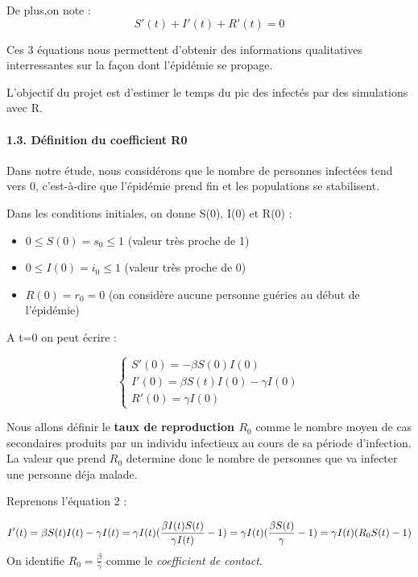 \documentclass[
]{article}
\providecommand{\tightlist}{%
  \setlength{\itemsep}{0pt}\setlength{\parskip}{0pt}}
\begin{document}
De plus,on note : \[S'(t) + I'(t) + R'(t) = 0 \]

Ces 3 équations nous permettent d'obtenir des informations qualitatives
interressantes sur la façon dont l'épidémie se propage.

L'objectif du projet est d'estimer le temps du pic des infectés par des
simulations avec R.

\hypertarget{duxe9finition-du-coefficient-r0}{%
\paragraph{1.3. Définition du coefficient
R0}\label{duxe9finition-du-coefficient-r0}}

Dans notre étude, nous considérons que le nombre de personnes infectées
tend vers 0, c'est-à-dire que l'épidémie prend fin et les populations se
stabilisent.

Dans les conditions initiales, on donne S(0), I(0) et R(0) :

\begin{itemize}
\tightlist
\item
  \(0 \leqslant S(0)= s_0 \leqslant 1\) (valeur très proche de 1)
\item
  \(0 \leqslant I(0)= i_0 \leqslant 1\) (valeur très proche de 0)
\item
  \(R(0)= r_0 =0\) (on considère aucune personne guéries au début de
  l'épidémie)
\end{itemize}

A t=0 on peut écrire :

\[\begin{equation}
    \left\{
     \begin{array}{l}
        S'(0)  = - \beta S(0)  I(0)\\
        I'(0)  = \beta S(t)  I(0) - \gamma  I(0)\\
        R'(0)  =  \gamma I(0)
      \end{array}
    \right.
\end{equation}\]

Nous allons définir le \textbf{taux de reproduction \(R_0\)} comme le
nombre moyen de cas secondaires produits par un individu infectieux au
cours de sa période d'infection. La valeur que prend \(R_0\) determine
donc le nombre de personnes que va infecter une personne déja malade.

Reprenons l'équation 2 :

\[ I'(t) = \beta S(t)  I(t) - \gamma  I(t) \\= \gamma I (t)(\frac{\beta I(t) S(t)}{\gamma I(t)} -1) \\= \gamma I(t) (\frac{\beta  S(t)}{\gamma } -1) \\ =\gamma I(t) (R_0 S(t) -1)\]
On identifie \(R_0 = \frac{\beta}{\gamma}\) comme le \emph{coefficient
de contact}.
\end{document}
